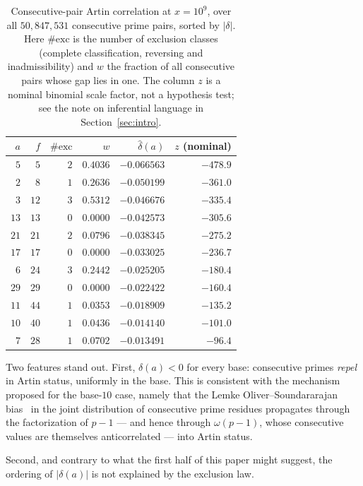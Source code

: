 \documentclass[11pt,reqno]{amsart}
\theoremstyle{plain}
\theoremstyle{definition}
\begin{document}
\begin{table}[t]
\centering
\caption{Consecutive-pair Artin correlation at $x = 10^9$, over all
$50{,}847{,}531$ consecutive prime pairs, sorted by $|\delta|$. Here
$\#\mathrm{exc}$ is the number of exclusion classes (complete classification,
reversing and inadmissibility) and $w$ the fraction of all consecutive pairs
whose gap lies in one. The column $z$ is a nominal binomial scale factor, not
a hypothesis test; see the note on inferential language in
Section~\ref{sec:intro}.}
\label{tab:delta}
\begin{tabular}{rrrrrr}
\toprule
$a$ & $f$ & $\#\mathrm{exc}$ & $w$ & $\widehat{\delta}(a)$ & $z$ (nominal) \\
\midrule
$5$  & $5$  & $2$ & $0.4036$ & $-0.066563$ & $-478.9$ \\
$2$  & $8$  & $1$ & $0.2636$ & $-0.050199$ & $-361.0$ \\
$3$  & $12$ & $3$ & $0.5312$ & $-0.046676$ & $-335.4$ \\
$13$ & $13$ & $0$ & $0.0000$ & $-0.042573$ & $-305.6$ \\
$21$ & $21$ & $2$ & $0.0796$ & $-0.038345$ & $-275.2$ \\
$17$ & $17$ & $0$ & $0.0000$ & $-0.033025$ & $-236.7$ \\
$6$  & $24$ & $3$ & $0.2442$ & $-0.025205$ & $-180.4$ \\
$29$ & $29$ & $0$ & $0.0000$ & $-0.022422$ & $-160.4$ \\
$11$ & $44$ & $1$ & $0.0353$ & $-0.018909$ & $-135.2$ \\
$10$ & $40$ & $1$ & $0.0436$ & $-0.014140$ & $-101.0$ \\
$7$  & $28$ & $1$ & $0.0702$ & $-0.013491$ & $-96.4$ \\
\bottomrule
\end{tabular}
\end{table}

Two features stand out. First, $\delta(a) < 0$ for every base: consecutive
primes \emph{repel} in Artin status, uniformly in the base. This is consistent
with the mechanism proposed for the base-$10$ case, namely that the
Lemke Oliver--Soundararajan bias~\cite{LOS2016} in the joint distribution of
consecutive prime residues propagates through the factorization of $p-1$ ---
and hence through $\omega(p-1)$, whose consecutive values are themselves
anticorrelated --- into Artin status.

Second, and contrary to what the first half of this paper might suggest, the
ordering of $|\delta(a)|$ is not explained by the exclusion law.
\end{document}
